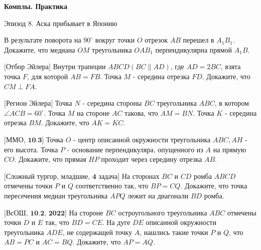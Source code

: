 \centerline{\bf \Huge Комплы. Практика}

\begin{flushright}
        \scriptsize{Эпизод 8. Аска прибывает в Японию}
\end{flushright}

В результате поворота на $90^{\circ}$ вокруг точки $O$ отрезок $A B$ перешел в $A_1 B_1$. Докажите, что медиана $O M$ треугольника $O A B_1$ перпендикулярна прямой $A_1 B$.

$\bigl[\textbf{Отбор Эйлера}\bigr]$
Внутри трапеции $A B C D(B C \| A D)$, где $A D=2 B C$, взята точка $F$, для которой $A B=F B$. Точка $M$ - середина отрезка $F D$. Докажите, что $C M \perp F A$.

$\bigl[\textbf{Регион Эйлера}\bigr]$
Точка $N$ - середина стороны $B C$ треугольника $A B C$, в котором $\angle A C B=60^{\circ}$. Точка $M$ на стороне $A C$ такова, что $A M=B N$. Точка $K$ - середина отрезка $BM$. Докажите, что $A K=K C$.

$\bigl[\textbf{ММО, 10.3}\bigr]$
Точка $O$ - центр описанной окружности треугольника $A B C, A H$ - его высота. Точка $P$ - основание перпендикуляра, опущенного из $A$ на прямую $C O$. Докажите, что прямая $H P$ проходит через середину отрезка $AB$.

$\bigl[\textbf{Сложный тургор, младшие, 4 задача}\bigr]$
На сторонах $B C$ и $C D$ ромба $A B C D$ отмечены точки $P$ и $Q$ соответственно так, что $B P=C Q$. Докажите, что точка пересечения медиан треугольника $A P Q$ лежит на диагонали $B D$ ромба.

$\bigl[\textbf{ВсОШ, 10.2, 2022}\bigr]$
На стороне $B C$ остроугольного треугольника $A B C$ отмечены точки $D$ и $E$ так, что $B D=C E$. На дуге $D E$ описанной окружности треугольника $A D E$, не содержащей точку $A$, нашлись такие точки $P$ и $Q$, что $A B=P C$ и $A C=B Q$. Докажите, что $A P=A Q$.
